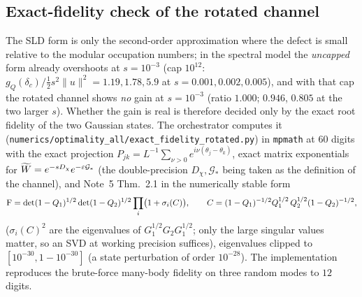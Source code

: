 \documentclass[11pt,a4paper]{article}
\begin{document}
\subsection{Exact-fidelity check of the rotated channel}\label{sec:exactfid}

The SLD form is only the second-order approximation where the defect is small relative to the
modular occupation numbers; in the spectral model the \emph{uncapped} form already overshoots at
\(s=10^{-3}\) (cap \(10^{12}\): \(g_Q(\delta_c)/\frac12s^2\|u\|^2=1.19,1.78,5.9\) at
\(s=0.001,0.002,0.005\)), and with that cap the rotated channel shows \emph{no} gain at \(s=10^{-3}\)
(ratio \(1.000\); \(0.946\), \(0.805\) at the two larger \(s\)).  Whether the gain is real is therefore
decided only by the exact root fidelity of the two Gaussian states.  The orchestrator computes it
(\texttt{numerics/optimality\_all/exact\_fidelity\_rotated.py}) in \texttt{mpmath} at \(60\) digits with the
exact projection \(P_{jk}=L^{-1}\sum_{\nu>0}e^{i\nu(\theta_j-\theta_k)}\), exact matrix exponentials for
\(\widetilde W=e^{-sD_\chi}e^{-\varepsilon\mathcal G_*}\) (the double-precision \(D_\chi,\mathcal G_*\) being
taken as the definition of the channel), and Note~5 Thm.~2.1 in the numerically stable form
\[
 \operatorname{F}=\det(1-Q_1)^{1/2}\det(1-Q_2)^{1/2}\prod_i\bigl(1+\sigma_i(C)\bigr),\qquad
 C=(1-Q_1)^{-1/2}Q_1^{1/2}\,Q_2^{1/2}(1-Q_2)^{-1/2},
\]
(\(\sigma_i(C)^2\) are the eigenvalues of \(G_1^{1/2}G_2G_1^{1/2}\); only the large singular values
matter, so an SVD at working precision suffices), eigenvalues clipped to \([10^{-30},1-10^{-30}]\)
(a state perturbation of order \(10^{-28}\)).  The implementation reproduces the brute-force
many-body fidelity on three random modes to \(12\) digits.
\end{document}
